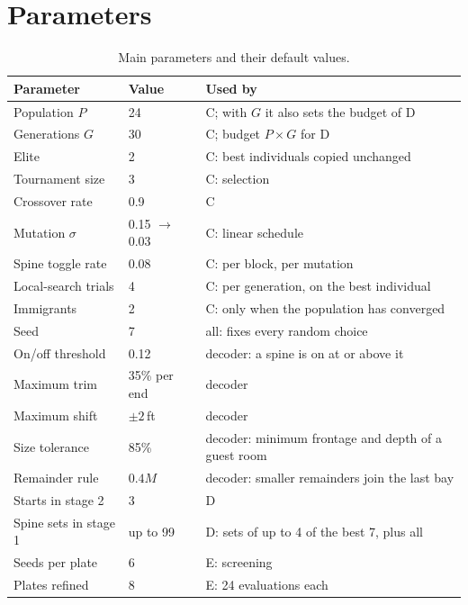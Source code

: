 \documentclass[10pt,a4paper]{article}
\begin{document}
\section{Parameters}
\begin{table}[H]\centering\small\caption{Main parameters and their default values.}\label{tab:par}
\begin{tabular}{@{}l l l@{}}
\toprule
\textbf{Parameter} & \textbf{Value} & \textbf{Used by} \\ \midrule
Population $P$ & 24 & C; with $G$ it also sets the budget of D \\
Generations $G$ & 30 & C; budget $P \times G$ for D \\
Elite & 2 & C: best individuals copied unchanged \\
Tournament size & 3 & C: selection \\
Crossover rate & 0.9 & C \\
Mutation $\sigma$ & 0.15 $\to$ 0.03 & C: linear schedule \\
Spine toggle rate & 0.08 & C: per block, per mutation \\
Local-search trials & 4 & C: per generation, on the best individual \\
Immigrants & 2 & C: only when the population has converged \\
Seed & 7 & all: fixes every random choice \\
On/off threshold & 0.12 & decoder: a spine is on at or above it \\
Maximum trim & 35\% per end & decoder \\
Maximum shift & $\pm 2$\,ft & decoder \\
Size tolerance & 85\% & decoder: minimum frontage and depth of a guest room \\
Remainder rule & $0.4M$ & decoder: smaller remainders join the last bay \\
Starts in stage 2 & 3 & D \\
Spine sets in stage 1 & up to 99 & D: sets of up to 4 of the best 7, plus all \\
Seeds per plate & 6 & E: screening \\
Plates refined & 8 & E: 24 evaluations each \\
\bottomrule
\end{tabular}
\end{table}
\end{document}
